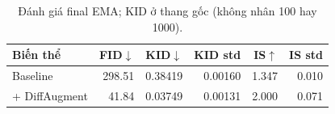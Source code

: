 \begin{table}[htbp]
\centering\small
\caption{Đánh giá final EMA; KID ở thang gốc (không nhân 100 hay 1000).}\label{tab:A2quality}
\begin{lrbox}{\reporttable}\begin{tabular}{lrrrrr}
\toprule
Biến thể & FID$\downarrow$ & KID$\downarrow$ & KID std & IS$\uparrow$ & IS std \\
\midrule
Baseline & 298.51 & 0.38419 & 0.00160 & 1.347 & 0.010 \\
+ DiffAugment & 41.84 & 0.03749 & 0.00131 & 2.000 & 0.071 \\
\bottomrule
\end{tabular}\end{lrbox}
\ifdim\wd\reporttable>\linewidth\resizebox{\linewidth}{!}{\usebox{\reporttable}}\else\usebox{\reporttable}\fi
\end{table}
